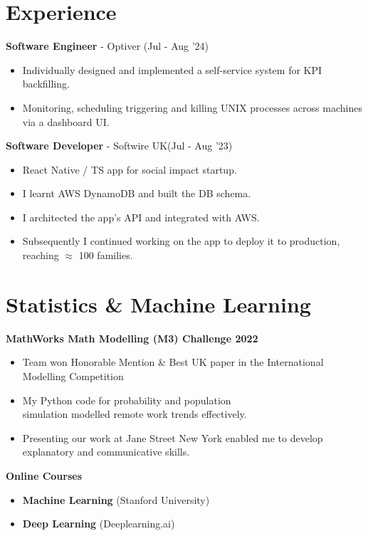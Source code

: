 \documentclass{Resume}
\begin{document}
        \section{Experience}
            \textbf{Software Engineer} - Optiver \hfill (Jul - Aug '24)
                \begin{itemize}
                    \item Individually designed and implemented a self-service system for KPI backfilling.
                    \item Monitoring, scheduling triggering and killing UNIX processes across machines via a dashboard UI.
                \end{itemize}            
            \textbf{Software Developer} - Softwire UK\hfill (Jul - Aug '23)
            \begin{itemize}
                \item React Native / TS app for social impact startup.
                \item I learnt AWS DynamoDB and built the DB schema.
                \item I architected the app's API and integrated with AWS.
                \item Subsequently I continued working on the app to deploy it to production, reaching  $\approx$ 100 families.  

            \end{itemize}

	\section{Statistics \& Machine Learning}
			\textbf{MathWorks Math Modelling (M3) Challenge 2022} 
			\begin{itemize}
                \item Team won Honorable Mention \& Best UK paper in the International Modelling Competition
			    \item My Python code for probability and population \\ simulation modelled remote work trends effectively.
			    \item Presenting our work at Jane Street New York enabled me to develop explanatory and communicative skills.
			\end{itemize}
            \textbf{Online Courses}
                \begin{itemize}
                    \item \textbf{Machine Learning} (Stanford University)
                    \item \textbf{Deep Learning} (Deeplearning.ai)
                \end{itemize}
\end{document}

